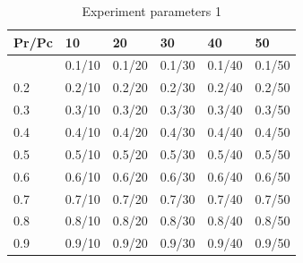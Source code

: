 \documentclass[12pt,a4paper]{IEEEtran}
\begin{document}
\begin{table}[h]
	\centering
	\tiny
\begin{tabular}{ | >{\columncolor[HTML]{000000}}l | l | l | l | l | l | }
	\hline
	\rowcolor[HTML]{000000} 
	{\color[HTML]{FFFFFF} Pr/Pc} & {\color[HTML]{FFFFFF}10} & {\color[HTML]{FFFFFF}20} & {\color[HTML]{FFFFFF}30} & {\color[HTML]{FFFFFF}40} & {\color[HTML]{FFFFFF}50} \\ \hline
	    {\color[HTML]{FFFFFF}0.1} & 0.1/10 & 0.1/20 & 0.1/30 & 0.1/40 & 0.1/50  \\ \hline
		{\color[HTML]{FFFFFF}0.2} & 0.2/10 & 0.2/20 & 0.2/30 & 0.2/40 & 0.2/50  \\ \hline
		{\color[HTML]{FFFFFF}0.3} & 0.3/10 & 0.3/20 & 0.3/30 & 0.3/40 & 0.3/50  \\ \hline
		{\color[HTML]{FFFFFF}0.4} & 0.4/10 & 0.4/20 & 0.4/30 & 0.4/40 & 0.4/50  \\ \hline
		{\color[HTML]{FFFFFF}0.5} & 0.5/10 & 0.5/20 & 0.5/30 & 0.5/40 & 0.5/50  \\ \hline
		{\color[HTML]{FFFFFF}0.6} & 0.6/10 & 0.6/20 & 0.6/30 & 0.6/40 & 0.6/50  \\ \hline
		{\color[HTML]{FFFFFF}0.7} & 0.7/10 & 0.7/20 & 0.7/30 & 0.7/40 & 0.7/50  \\ \hline
		{\color[HTML]{FFFFFF}0.8} & 0.8/10 & 0.8/20 & 0.8/30 & 0.8/40 & 0.8/50  \\ \hline
		{\color[HTML]{FFFFFF}0.9} & 0.9/10 & 0.9/20 & 0.9/30 & 0.9/40 & 0.9/50  \\ \hline
	\end{tabular}
	\caption{Experiment parameters 1}
	\label{tab:compressionExperimentEffect1}
\end{table}
\end{document}
